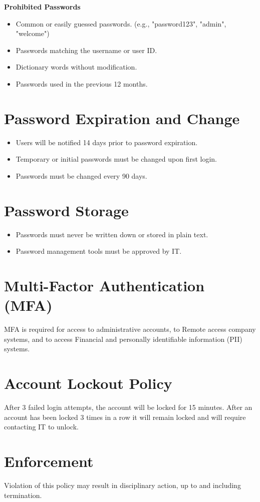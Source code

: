 \textbf{Prohibited Passwords}
\begin{itemize}
    \item Common or easily guessed passwords. (e.g., "password123", "admin", "welcome")
    \item Passwords matching the username or user ID.
    \item Dictionary words without modification.
    \item Passwords used in the previous 12 months.
\end{itemize}

\section{Password Expiration and Change}
\begin{itemize}
    \item Users will be notified 14 days prior to password expiration.
    \item Temporary or initial passwords must be changed upon first login.
    \item Passwords must be changed every 90 days.
\end{itemize}

\section{Password Storage}
\begin{itemize}
    \item Passwords must never be written down or stored in plain text.
    \item Password management tools must be approved by IT.
\end{itemize}

\section{Multi-Factor Authentication (MFA)}
MFA is required for access to administrative accounts, to Remote access company systems, and to access Financial and personally identifiable information (PII) systems.

\section{Account Lockout Policy}
After 3 failed login attempts, the account will be locked for 15 minutes. After an account has been locked 3 times in a row it will remain locked and will require contacting IT to unlock.

\section{Enforcement}
Violation of this policy may result in disciplinary action, up to and including termination.

